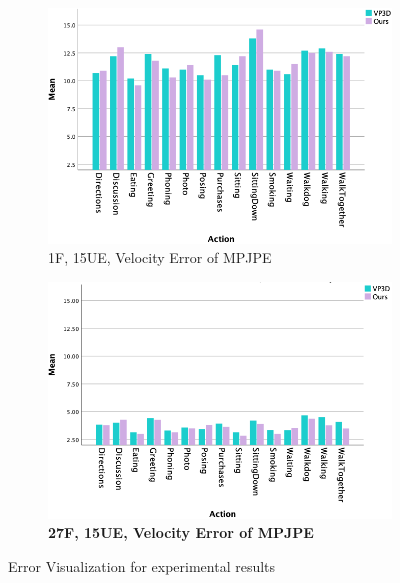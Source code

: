 \documentclass[10pt,twocolumn,letterpaper]{article}
\begin{document}
\begin{figure}
     \begin{subfigure}[b]{0.49\textwidth}
         \centering
         \includegraphics[width=\textwidth]{mean_error_comparison_3.png}
         \caption{1F, 15UE, Velocity Error of MPJPE}
         \label{fig:est_c}
     \end{subfigure}
     \hfill
     \begin{subfigure}[b]{0.49\textwidth}
         \centering
         \includegraphics[width=\textwidth]{mean_error_comparison_4.png}
         \caption{\textbf{27F, 15UE, Velocity Error of MPJPE}}
         \label{fig:est_d}
     \end{subfigure}
     \hfill
        \caption{Error Visualization for experimental results}
        \label{fig:four_error_graphs}
\end{figure}
\end{document}
